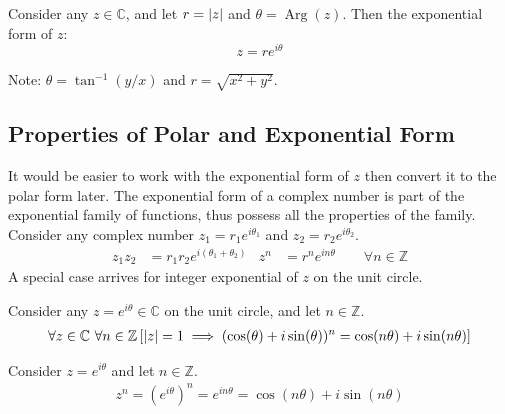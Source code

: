 \documentclass[12pt, english]{book}
\makeatletter
\renewenvironment{proof}[1][\proofname]{\par
	\pushQED{\qed}%
	\normalfont \topsep6\p@\@plus6\p@\relax
	\list{}{%
		\settowidth{\leftmargin}{\itshape\proofname:\hskip\labelsep}%
		\setlength{\labelwidth}{0pt}%
		\setlength{\itemindent}{-\leftmargin}%
	}%
	\item[\hskip\labelsep\itshape#1\@addpunct{:}]\ignorespaces
}{%
	\popQED\endlist\@endpefalse
}
\makeatother
\begin{document}
	\begin{definition}
	Consider any $z \in \mathbb{C}$, and let $r = \abs{z}$ and $\theta = \operatorname{Arg}(z)$. Then the exponential form of $z$:
		$$z = r e^{i \theta}$$
		\label{Exponential Form of z - Complex}
	\end{definition}
	Note: $\theta = \tan^{-1}(y/x)$ and $r = \sqrt{x^2 + y^2}$.
	\begin{center}
	\end{center}
	
	\subsection{Properties of Polar and Exponential Form} \label{Properties of Polar and Exponential Form Subsection - Complex}
	It would be easier to work with the exponential form of $z$ then convert it to the polar form later. The exponential form of a complex number is part of the exponential family of functions, thus possess all the properties of the family. Consider any complex number $z_1 = r_1 e^{i\theta_1}$ and $z_2 = r_2 e^{i\theta_2}$.
	\begin{align*}
		z_1  z_2 &= r_1 r_2 e^{i(\theta_1 + \theta_2)} 
			& z^n &= r^n e^{i n \theta} \qquad \forall n \in \mathbb{Z}
	\end{align*}
	A special case arrives for integer exponential of $z$ on the unit circle.
	\begin{theorem}
		Consider any $z = e^{i \theta} \in \mathbb{C}$ on the unit circle, and let $n \in \mathbb{Z}$.
		\begin{align*}
			\forall z\in \mathbb{C} \ \forall n \in \mathbb{Z}
			\left[\abs{z} = 1 \implies (\cos(\theta) + i\sin(\theta))^n = \cos(n \theta) + i\sin(n \theta)\right]
		\end{align*}
		\label{de Moivre's Formula Theorem - Complex}
	\end{theorem}
	\begin{proof}
		Consider $z = e^{i \theta}$ and let $n \in \mathbb{Z}$. 
		\begin{align*}
			z^n = (e^{i \theta})^n = e^{in\theta} = \cos(n\theta) + i\sin(n\theta)
		\end{align*}
	\end{proof}
\end{document}
